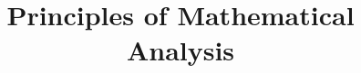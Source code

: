 


    \title{Principles of Mathematical Analysis}
    \maketitle

    
    
    
    
    
    
    
    
    

